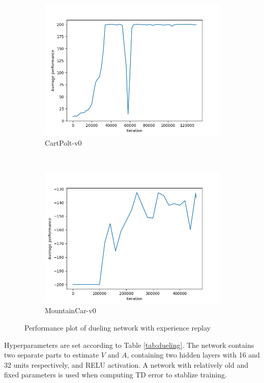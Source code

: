 \documentclass[12pt]{article}
\begin{document}
\begin{figure}[h!]
    \centering
    \begin{subfigure}[t]{0.6\textwidth}
        \includegraphics[width=1\textwidth]{figs/Q4_cp.png}
        \caption{CartPolt-v0}
    \end{subfigure}
    ~
    \begin{subfigure}[t]{0.6\textwidth}
        \includegraphics[width=1\textwidth]{figs/Q4_mc.png}
        \caption{MountainCar-v0}
    \end{subfigure}
    \caption{Performance plot of dueling network with experience replay}
    \label{fig:q4}
\end{figure}

Hyperparameters are set according to Table \ref{tab:dueling}. The network contains two separate parts to estimate $V$ and $A$, containing two hidden layers with 16 and 32 units respectively, and RELU activation. A network with relatively old and fixed parameters is used when computing TD error to stablize training.
\end{document}
